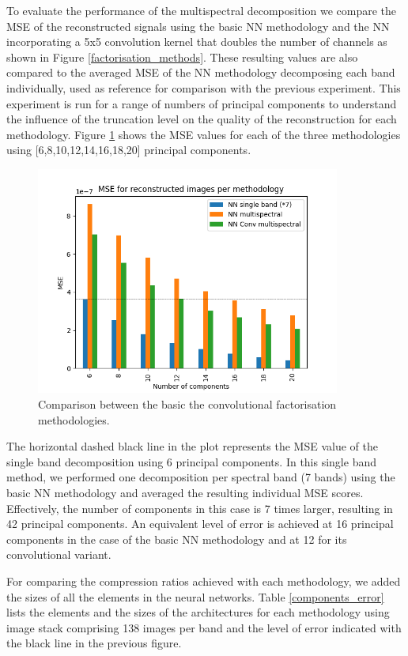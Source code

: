 \documentclass[essd, manuscript]{copernicus}
\begin{document}
To evaluate the performance of the multispectral decomposition we compare the MSE of the reconstructed signals using the basic NN methodology and the NN incorporating a 5x5 convolution kernel that doubles the number of channels as shown in Figure \ref{factorisation_methods}. These resulting values are also compared to the averaged MSE of the NN methodology decomposing each band individually, used as reference for comparison with the previous experiment. This experiment is run for a range of numbers of principal components to understand the influence of the truncation level on the quality of the reconstruction for each methodology. Figure \ref{compression_cmp} shows the MSE values for each of the three methodologies using [6,8,10,12,14,16,18,20] principal components.

\begin{figure}
    \includegraphics[width=10cm]{fig8.png}
    \caption{Comparison between the basic the convolutional factorisation methodologies.}%
    \label{compression_cmp}%
\end{figure}

The horizontal dashed black line in the plot represents the MSE value of the single band decomposition using 6 principal components. In this single band method, we performed one decomposition per spectral band (7 bands) using the basic NN methodology and averaged the resulting individual MSE scores. Effectively, the number of components in this case is 7 times larger, resulting in 42 principal components. An equivalent level of error is achieved at 16 principal components in the case of the basic NN methodology and at 12 for its convolutional variant. 

For comparing the compression ratios achieved with each methodology, we added the sizes of all the elements in the neural networks. Table \ref{components_error} lists the elements and the sizes of the architectures for each methodology using image stack comprising 138 images per band and the level of error indicated with the black line in the previous figure.
\end{document}
